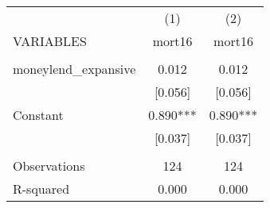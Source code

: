 \documentclass[landscape]{article}
\begin{document}
\begin{tabular}{lcc} \hline
 & (1) & (2) \\
VARIABLES & mort16 & mort16 \\ \hline
 &  &  \\
moneylend\_expansive & 0.012 & 0.012 \\
 & [0.056] & [0.056] \\
Constant & 0.890*** & 0.890*** \\
 & [0.037] & [0.037] \\
 &  &  \\
Observations & 124 & 124 \\
 R-squared & 0.000 & 0.000 \\ \hline
\end{tabular}
\end{document}
